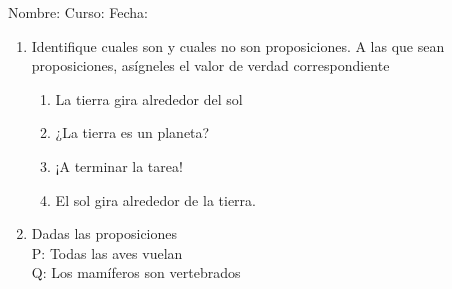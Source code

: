 \documentclass[letterpaper,fleqn]{article}
\newcommand{\LineaNombre}{%
\par
\vspace{\baselineskip}
Nombre:\hrulefill \; Curso: \underline{\hspace*{48pt}} \; Fecha: \underline{\hspace*{2.5cm}} \relax
\par}
\begin{document}
\LineaNombre
\begin{enumerate}
 \item Identifique cuales son y cuales no son proposiciones. A las que sean proposiciones, as\'{i}gneles el valor de verdad correspondiente
 \begin{enumerate}
 \item La tierra gira alrededor del sol
 \item ¿La tierra es un planeta?
 \item ¡A terminar la tarea!
 \item El sol gira alrededor de la tierra.
 \end{enumerate}
 \item Dadas las proposiciones\\
 P: Todas las aves vuelan\\
 Q: Los mamíferos son vertebrados\\
 

\end{enumerate}
\end{document}
